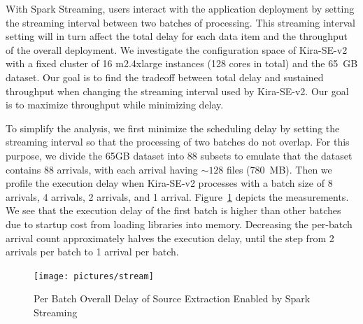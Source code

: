\documentclass[10pt,journal,compsoc]{IEEEtran}
\begin{document}
With Spark Streaming, users interact with the application deployment by setting the streaming interval between two batches of processing.
This streaming interval setting will in turn affect the total delay for each data item and the throughput of the overall deployment.
We investigate the configuration space of Kira-SE-v2 with a fixed cluster of 16 m2.4xlarge instances (128 cores in total) and 
the 65~GB dataset. 
Our goal is to find the tradeoff between total delay and sustained throughput when changing the streaming interval used by Kira-SE-v2. Our goal is to
maximize throughput while minimizing delay.

To simplify the analysis, we first minimize the scheduling delay by setting the streaming interval so that the processing of two batches
do not overlap.
For this purpose, we divide the 65GB dataset into 88 subsets to emulate that the dataset contains 88 arrivals, 
with each arrival having $\sim128$ files (780~MB).
Then we profile the execution delay when Kira-SE-v2 processes with a batch size of 8 arrivals, 4 arrivals, 2 arrivals, and 1 arrival.
Figure~\ref{fig:stream} depicts the measurements.
We see that the execution delay of the first batch is higher than other batches due to startup cost from loading libraries into memory.
Decreasing the per-batch arrival count approximately halves the execution delay, until the step from 2 arrivals per batch to 1 arrival per batch.

\begin{figure}[h]
	\begin{center}
		\texttt{[image: pictures/stream]}
		\caption{Per Batch Overall Delay of Source Extraction Enabled by Spark Streaming
		\label{fig:stream}}
  	\end{center}
\end{figure}
\end{document}
